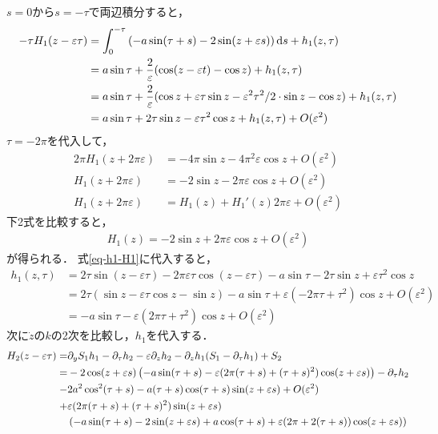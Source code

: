 \documentclass[../main]{subfiles}
\begin{document}
    $s=0$から$s=-\tau$で両辺積分すると，
    \begin{align}
        -\tau H_1(z-\varepsilon \tau)&=\int_0^{-\tau}\left(-a\sin(\tau+s)-2\sin(z+\varepsilon s)\right)\dd{s}+h_1(z,\tau)\notag \\
        &=a \sin\tau+\frac{2}{\varepsilon}(\cos (z-\varepsilon t)-\cos  z)+h_1(z,\tau)\notag\\
        &=a \sin\tau+\frac{2}{\varepsilon}(\cos z+\varepsilon \tau\sin z-\varepsilon^2\tau^2/2\cdot\sin z-\cos z)+h_1(z,\tau)\notag\\
        &=a \sin\tau+2\tau\sin z-\varepsilon \tau^2\cos z+h_1(z,\tau)+O(\varepsilon^2)
        \label{eq-h1-H1}
    \end{align}
    $\tau=-2\pi$を代入して，
    \begin{align*}
        2\pi H_1\left(z+ 2\pi\varepsilon\right)&=-4\pi\sin z-4\pi^2\varepsilon \cos z+O(\varepsilon^2)\\
        H_1\left(z+2\pi\varepsilon\right)&=-2 \sin z-2\pi\varepsilon \cos z+O(\varepsilon^2)\\
        H_1\left(z+2\pi\varepsilon\right)&=H_1(z)+H_1'(z) 2\pi\varepsilon+O(\varepsilon^2)
    \end{align*}
    下2式を比較すると，
    \begin{align*}
        H_1(z)=-2\sin z+2\pi\varepsilon \cos z+O(\varepsilon^2)
    \end{align*}
    が得られる．
    式\eqref{eq-h1-H1}に代入すると，
    \begin{align*}
        h_1(z,\tau)&=2\tau\sin(z-\varepsilon \tau)-2\pi\varepsilon \tau\cos(z-\varepsilon \tau)-a\sin\tau-2\tau\sin z+\varepsilon \tau^2\cos z\\
        &=2\tau(\sin z-\varepsilon \tau\cos z-\sin z)-a\sin\tau+\varepsilon(-2\pi \tau+\tau^2)\cos z+O(\varepsilon^2)\\
        &=-a\sin\tau-\varepsilon(2\pi \tau+\tau^2)\cos z+O(\varepsilon^2)
    \end{align*}
    次に$\dot{z}$の$k$の2次を比較し，$h_1$を代入する．
    \begin{align*}
        H_2(z-\varepsilon \tau)=&\partial_y S_1h_1 -\partial_\tau h_2-\varepsilon\partial_zh_2 -\partial_zh_1(S_1-\partial_\tau h_1)+S_2\\
        =&-2\cos (z+\varepsilon s)\left( -a\sin(\tau+s)-\varepsilon(2\pi (\tau+s)+(\tau+s)^2) \cos (z+\varepsilon s) \right)-\partial_\tau h_2\\
        -&2a^2\cos^2(\tau+s)-a(\tau+s)\cos (\tau+s)\sin (z+\varepsilon s)+O(\varepsilon^2)\\
        +&\varepsilon(2\pi(\tau+s)+(\tau+s)^2)\sin (z+\varepsilon s) \\
        &\left( -a\sin(\tau+s)-2\sin (z+\varepsilon s) +a\cos(\tau+s)+\varepsilon(2\pi +2(\tau+s))\cos (z+\varepsilon s)\right)
    \end{align*}
\end{document}
